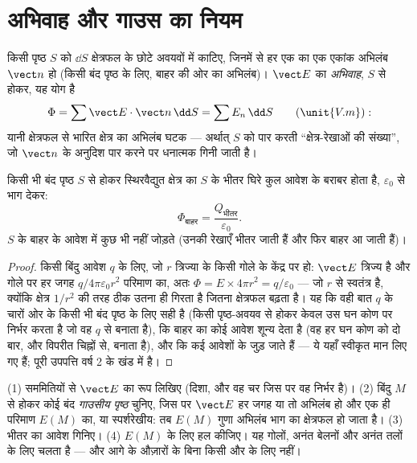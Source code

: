 \section{अभिवाह और गाउस का नियम}

\begin{definition}[क्षेत्र का अभिवाह]\label{def:b1:electrostatics-gauss:flux}
किसी पृष्ठ $S$ को $\dd S$ क्षेत्रफल के छोटे अवयवों में काटिए, जिनमें से हर
एक का एक एकांक अभिलंब $\vect n$ हो (किसी बंद पृष्ठ के लिए, बाहर की ओर का
अभिलंब)। $\vect E$ का \emph{अभिवाह}, $S$ से होकर, यह योग है
\[
\Phi = \sum \vect E\cdot\vect n\,\dd S = \sum E_n\,\dd S \qquad (\unit{V.m}):
\]
यानी क्षेत्रफल से भारित क्षेत्र का अभिलंब घटक --- अर्थात् $S$ को पार करती
``क्षेत्र-रेखाओं की संख्या'', जो $\vect n$ के अनुदिश पार करने पर धनात्मक
गिनी जाती है।
\end{definition}

\begin{theorem}[गाउस का नियम]\label{thm:b1:electrostatics-gauss:gauss}
किसी भी बंद पृष्ठ $S$ से होकर स्थिरवैद्युत क्षेत्र का  $S$ के भीतर
घिरे कुल आवेश के बराबर होता है, $\varepsilon_0$ से भाग देकर:
\[
\Phi_{\text{बाहर}} = \frac{Q_{\text{भीतर}}}{\varepsilon_0} .
\]
$S$ के बाहर के आवेश  में कुछ भी नहीं जोड़ते (उनकी रेखाएँ भीतर जाती
हैं और फिर बाहर आ जाती हैं)।
\end{theorem}

\begin{proof}
किसी बिंदु आवेश $q$ के लिए, जो $r$ त्रिज्या के किसी गोले के केंद्र पर हो:
$\vect E$ त्रिज्य है और गोले पर हर जगह $q/4\pi\varepsilon_0r^2$ परिमाण का, अतः
$\Phi = E \times 4\pi r^2 = q/\varepsilon_0$ --- जो $r$ से स्वतंत्र है,
क्योंकि क्षेत्र $1/r^2$ की तरह ठीक उतना ही गिरता है जितना क्षेत्रफल बढ़ता
है। यह कि वही बात $q$ के चारों ओर के किसी भी बंद पृष्ठ के लिए सही है (किसी
पृष्ठ-अवयव से होकर  केवल उस घन कोण पर निर्भर करता है जो वह $q$ से
बनाता है), कि बाहर का कोई आवेश शून्य देता है (वह हर घन कोण को दो बार, और
विपरीत चिह्नों से, बनाता है), और कि कई आवेशों के  जुड़ जाते हैं ---
ये यहाँ स्वीकृत मान लिए गए हैं; पूरी उपपत्ति वर्ष 2 के खंड में है।
\end{proof}

\begin{method}[गाउस का नियम काम में लेना]\label{meth:b1:electrostatics-gauss:gauss}
(1) सममितियों से $\vect E$ का रूप लिखिए (दिशा, और वह चर जिस पर वह निर्भर
है)। (2) बिंदु $M$ से होकर कोई बंद \emph{गाउसीय पृष्ठ} चुनिए, जिस पर
$\vect E$ हर जगह या तो अभिलंब हो और एक ही परिमाण $E(M)$ का, या स्पर्शरेखीय:
तब  $E(M)$ गुणा अभिलंब भाग का क्षेत्रफल हो जाता है। (3) भीतर का आवेश
गिनिए। (4) $E(M)$ के लिए हल कीजिए। यह गोलों, अनंत बेलनों और अनंत तलों के लिए
चलता है --- और आगे के औज़ारों के बिना किसी और के लिए नहीं।
\end{method}

